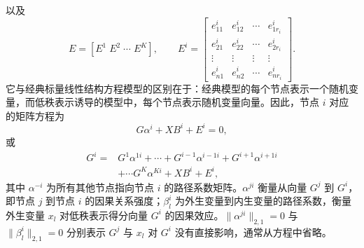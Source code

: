 以及
\[
E=[E^1\;E^2\;\cdots\;E^K],\qquad
E^i=\begin{bmatrix}
e_{11}^i&e_{12}^i&\cdots&e_{1r_i}^i\\
e_{21}^i&e_{22}^i&\cdots&e_{2r_i}^i\\
\vdots&\vdots&\vdots&\vdots\\
e_{n1}^i&e_{n2}^i&\cdots&e_{nr_i}^i
\end{bmatrix}.
\]
它与经典标量线性结构方程模型的区别在于：经典模型的每个节点表示一个随机变量，而低秩表示诱导的模型中，每个节点表示随机变量向量。因此，节点 $i$ 对应的矩阵方程为
\begin{equation}
G\alpha^i+XB^i+E^i=0,
\tag{4.167}
\end{equation}
或
\[
\begin{aligned}
G^i={}&G^1\alpha^{1i}+\cdots+G^{i-1}\alpha^{i-1i}
+G^{i+1}\alpha^{i+1i}\\
&+\cdots G^K\alpha^{Ki}+XB^i+E^i,
\end{aligned}
\]
其中 $\alpha^{-i}$ 为所有其他节点指向节点 $i$ 的路径系数矩阵。$\alpha^{ji}$ 衡量从向量 $G^j$ 到 $G^i$，即节点 $j$ 到节点 $i$ 的因果关系强度；$\beta_l^i$ 为外生变量到内生变量的路径系数，衡量外生变量 $x_l$ 对低秩表示得分向量 $G^i$ 的因果效应。$\lVert\alpha^{ji}\rVert_{2,1}=0$ 与 $\lVert\beta_l^i\rVert_{2,1}=0$ 分别表示 $G^j$ 与 $x_l$ 对 $G^i$ 没有直接影响，通常从方程中省略。

